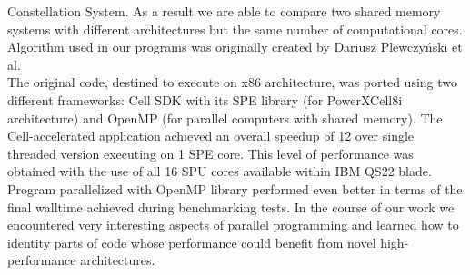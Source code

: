 Constellation System.
As a result we are able to compare two shared memory systems with different
architectures but the same number of computational cores.
Algorithm used in our programs  was originally created by Dariusz Plewczy\'nski
et al. \cite{3dhit1,3dhit2}\\
The original code, destined to execute on x86 architecture, was ported using two
different frameworks: Cell SDK with its SPE library (for PowerXCell8i
architecture) and OpenMP (for parallel computers with shared memory).
The Cell-accelerated application achieved an overall speedup of 12 over
single threaded version executing on 1 SPE core.
This level of performance was obtained with the use of all 16 SPU cores
available within IBM QS22 blade.
Program parallelized with OpenMP library performed even better in terms of the
final walltime achieved during benchmarking tests.
In the course of our work we encountered very interesting aspects of parallel
programming and learned how to identity parts of code whose performance
could benefit from novel high-performance architectures.

